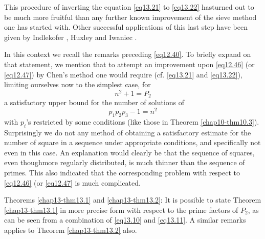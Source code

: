 This procedure of inverting the equation \eqref{eq13.21} to
\eqref{eq13.22} has\break turned out to be much more fruitful than any
further known improvement 
of the sieve method one has started with. Other successful
applications of this last step have been given by Indlekofer \cite{key2},
Huxley and Iwaniec \cite{key1}. 

In this context we recall the remarks preceding \eqref{eq12.40}. To briefly
expand on that statement, we mention that to attempt an improvement
upon \eqref{eq12.46} (or \eqref{eq12.47}) by Chen's method one would require
(cf. \eqref{eq13.21} and \eqref{eq13.22}), limiting ourselves now to
the simplest case, for 
\begin{equation*}
n^2+1= P_2 \tag{13.24}\label{eq13.24}
\end{equation*}  
a satisfactory upper bound for the number of solutions of 
\begin{equation*}
p_1p_2p_3-1=n^2\tag{13.25}\label{eq13.25}
\end{equation*}  
with $p_i$'s restricted by some conditions (like those in Theorem
\ref{chap10-thm10.3}). Surprisingly  we do not any method of obtaining a
satisfactory estimate for the number of square in a sequence under
appropriate conditions, and specifically not even in this case. An
explanation would  clearly be that the sequence of squares, even
though\pageoriginale more regularly distributed, is much thinner than
the sequence 
of primes. This also indicated that the corresponding problem with
respect to \eqref{eq12.46} (or \eqref{eq12.47} is  much complicated. 
  
Theorems \ref{chap13-thm13.1} and \ref{chap13-thm13.2}: It is possible
to state Theorem \ref{chap13-thm13.1} in 
more precise form with respect to the prime factors of $P_2$, as can
be seen from a combination of \eqref{eq13.10} and \eqref{eq13.11}. A similar
remarks applies to Theorem \ref{chap13-thm13.2} also. 
  
